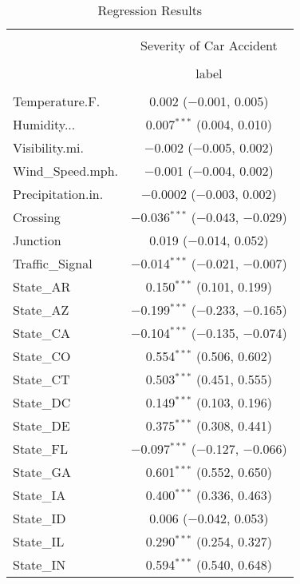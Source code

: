
\begin{table}[!htbp] \centering 
  \caption{Regression Results} 
  \label{} 
\begin{tabular}{@{\extracolsep{5pt}}lc} 
\\[-1.8ex]\hline 
\hline \\[-1.8ex] 
 & \multicolumn{1}{c}{Severity of Car Accident} \\ 
\cline{2-2} 
\\[-1.8ex] & label \\ 
\hline \\[-1.8ex] 
 Temperature.F. & 0.002 ($-$0.001, 0.005) \\ 
  Humidity... & 0.007$^{***}$ (0.004, 0.010) \\ 
  Visibility.mi. & $-$0.002 ($-$0.005, 0.002) \\ 
  Wind\_Speed.mph. & $-$0.001 ($-$0.004, 0.002) \\ 
  Precipitation.in. & $-$0.0002 ($-$0.003, 0.002) \\ 
  Crossing & $-$0.036$^{***}$ ($-$0.043, $-$0.029) \\ 
  Junction & 0.019 ($-$0.014, 0.052) \\ 
  Traffic\_Signal & $-$0.014$^{***}$ ($-$0.021, $-$0.007) \\ 
  State\_AR & 0.150$^{***}$ (0.101, 0.199) \\ 
  State\_AZ & $-$0.199$^{***}$ ($-$0.233, $-$0.165) \\ 
  State\_CA & $-$0.104$^{***}$ ($-$0.135, $-$0.074) \\ 
  State\_CO & 0.554$^{***}$ (0.506, 0.602) \\ 
  State\_CT & 0.503$^{***}$ (0.451, 0.555) \\ 
  State\_DC & 0.149$^{***}$ (0.103, 0.196) \\ 
  State\_DE & 0.375$^{***}$ (0.308, 0.441) \\ 
  State\_FL & $-$0.097$^{***}$ ($-$0.127, $-$0.066) \\ 
  State\_GA & 0.601$^{***}$ (0.552, 0.650) \\ 
  State\_IA & 0.400$^{***}$ (0.336, 0.463) \\ 
  State\_ID & 0.006 ($-$0.042, 0.053) \\ 
  State\_IL & 0.290$^{***}$ (0.254, 0.327) \\ 
  State\_IN & 0.594$^{***}$ (0.540, 0.648) \\ 

\end{tabular}
\end{table}

